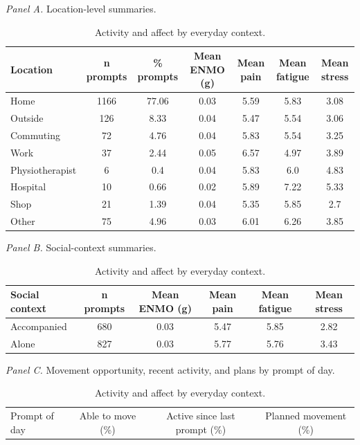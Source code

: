 \begin{table}[H]
\raggedright
\caption{Activity and affect by everyday context.}
\label{tab:sup-context}
\footnotesize
\begingroup
\setlength{\tabcolsep}{4pt}
\renewcommand{\arraystretch}{1.08}
\noindent\textit{Panel A.} Location-level summaries.\par\vspace{2pt}
\begin{tabular*}{\textwidth}{@{\extracolsep{\fill}}lcccccc@{}}
\toprule
Location & n prompts & \% prompts & Mean ENMO (g) & Mean pain & Mean fatigue & Mean stress \\
\midrule
Home & 1166 & 77.06 & 0.03 & 5.59 & 5.83 & 3.08 \\
Outside & 126 & 8.33 & 0.04 & 5.47 & 5.54 & 3.06 \\
Commuting & 72 & 4.76 & 0.04 & 5.83 & 5.54 & 3.25 \\
Work & 37 & 2.44 & 0.05 & 6.57 & 4.97 & 3.89 \\
Physiotherapist & 6 & 0.4 & 0.04 & 5.83 & 6.0 & 4.83 \\
Hospital & 10 & 0.66 & 0.02 & 5.89 & 7.22 & 5.33 \\
Shop & 21 & 1.39 & 0.04 & 5.35 & 5.85 & 2.7 \\
Other & 75 & 4.96 & 0.03 & 6.01 & 6.26 & 3.85 \\
\bottomrule
\end{tabular*}
\par\vspace{6pt}\noindent\textit{Panel B.} Social-context summaries.\par\vspace{2pt}
\begin{tabular*}{\textwidth}{@{\extracolsep{\fill}}lccccc@{}}
\toprule
Social context & n prompts & Mean ENMO (g) & Mean pain & Mean fatigue & Mean stress \\
\midrule
Accompanied & 680 & 0.03 & 5.47 & 5.85 & 2.82 \\
Alone & 827 & 0.03 & 5.77 & 5.76 & 3.43 \\
\bottomrule
\end{tabular*}
\par\vspace{6pt}\noindent\textit{Panel C.} Movement opportunity, recent activity, and plans by prompt of day.\par\vspace{2pt}
\begin{tabular*}{\textwidth}{@{\extracolsep{\fill}}lccc@{}}
\toprule
Prompt of day & Able to move (\%) & Active since last prompt (\%) & Planned movement (\%) \\

\end{tabular*}
\end{table}
